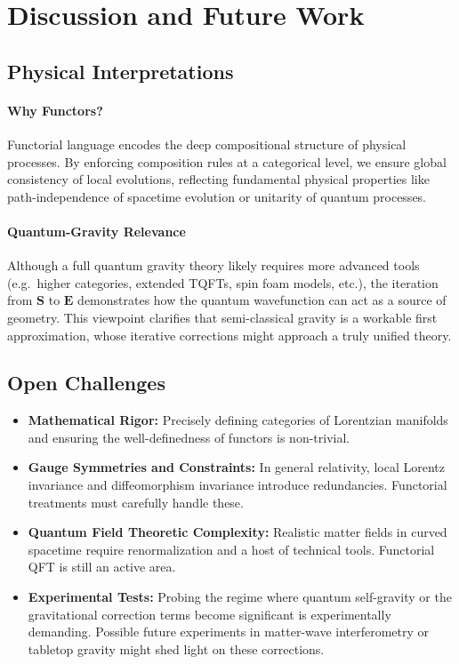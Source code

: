 \documentclass[12pt]{article}
\begin{document}
\section{Discussion and Future Work}
\subsection{Physical Interpretations}
\paragraph{Why Functors?}
Functorial language encodes the deep compositional structure of physical processes. By enforcing composition rules at a categorical level, we ensure global consistency of local evolutions, reflecting fundamental physical properties like path-independence of spacetime evolution or unitarity of quantum processes.

\paragraph{Quantum-Gravity Relevance}
Although a full quantum gravity theory likely requires more advanced tools (e.g.\ higher categories, extended TQFTs, spin foam models, etc.), the iteration from \(\mathbf{S}\) to \(\mathbf{E}\) demonstrates how the quantum wavefunction can act as a source of geometry. This viewpoint clarifies that semi-classical gravity is a workable first approximation, whose iterative corrections might approach a truly unified theory.

\subsection{Open Challenges}
\begin{itemize}
    \item \textbf{Mathematical Rigor:} Precisely defining categories of Lorentzian manifolds and ensuring the well-definedness of functors is non-trivial.
    \item \textbf{Gauge Symmetries and Constraints:} In general relativity, local Lorentz invariance and diffeomorphism invariance introduce redundancies. Functorial treatments must carefully handle these.
    \item \textbf{Quantum Field Theoretic Complexity:} Realistic matter fields in curved spacetime require renormalization and a host of technical tools. Functorial QFT is still an active area.
    \item \textbf{Experimental Tests:} Probing the regime where quantum self-gravity or the gravitational correction terms become significant is experimentally demanding. Possible future experiments in matter-wave interferometry or tabletop gravity might shed light on these corrections.
\end{itemize}
\end{document}
